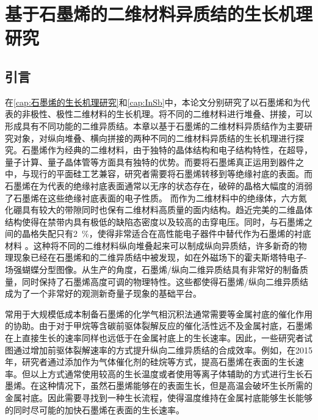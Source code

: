 \chapter{基于石墨烯的二维材料异质结的生长机理研究}
\section{引言}
在\ref{cap:石墨烯的生长机理研究}和\ref{cap:InSb}中，本论文分别研究了以石墨烯和为代表的非极性、极性二维材料的生长机理。将不同的二维材料进行堆叠、拼接，可以形成具有不同功能的二维异质结。本章以基于石墨烯的二维材料异质结作为主要研究对象，对纵向堆叠、横向拼接的两种不同的二维材料异质结的生长机理进行探究。石墨烯作为经典的二维材料，由于独特的晶体结构和电子结构特性，在超导，量子计算、量子晶体管等方面具有独特的优势。而要将石墨烯真正运用到器件之中，与现行的平面硅工艺兼容，研究者需要将石墨烯转移到等绝缘衬底的表面。而石墨烯在为代表的绝缘衬底表面通常以无序的状态存在，破碎的晶格大幅度的消弱了石墨烯在这些绝缘衬底表面的电子性质。
而作为二维材料中的绝缘体，六方氮化硼具有较大的带隙同时也保有二维材料高质量的面内结构。趋近完美的二维晶体结构使得在禁带内具有极低的缺陷态密度以及较高的击穿电压。同时，与石墨烯之间的晶格失配只有\SI{2}{\percent}，使得非常适合在高性能电子器件中替代作为石墨烯的衬底材料 。这种将不同的二维材料纵向堆叠起来可以制成纵向异质结，许多新奇的物理现象已经在石墨烯和的二维异质结中被发现，如在外磁场下的霍夫斯塔特电子-场强蝴蝶分型图像。从生产的角度，石墨烯/纵向二维异质结具有非常好的制备质量，同时保持了石墨烯高度可调的物理特性。这些都使得石墨烯/纵向二维异质结成为了一个非常好的观测新奇量子现象的基础平台。

常用于大规模低成本制备石墨烯的化学气相沉积法通常需要等金属衬底的催化作用的协助。由于对于甲烷等含碳前驱体裂解反应的催化活性远不及金属衬底，石墨烯在上直接生长的速率同样也远低于在金属衬底上的生长速率。因此，一些研究者试图通过增加前驱体裂解速率的方式提升纵向二维异质结的合成效率。例如，在2015年，研究者通过添加作为气体催化剂的硅烷等方式，提高石墨烯在表面的生长速率。但以上方式通常使用较高的生长温度或者使用等离子体辅助的方式进行生长石墨烯。在这种情况下，虽然石墨烯能够在的表面生长，但是高温会破坏生长所需的金属衬底。因此需要寻找到一种生长流程，使得温度维持在金属衬底能够生长能够的同时尽可能的加快石墨烯在表面的生长速率。

